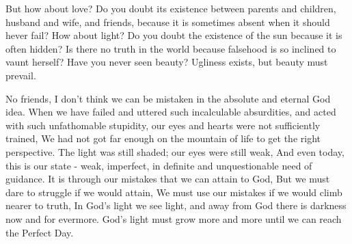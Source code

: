 But how about love? Do you doubt its existence
between parents and children, husband and wife, and
friends, because it is sometimes absent when it should
hever fail? How about light? Do you doubt the existence
of the sun because it is often hidden? Is there no truth
in the world because falsehood is so inclined to vaunt
herself? Have you never seen beauty? Ugliness exists, but
beauty must prevail.

No friends, I don't think we can be mistaken in the
absolute and eternal God idea. When we have failed and
uttered such incalculable absurdities, and acted with such
unfathomable stupidity, our eyes and hearts were not sufficiently
trained, We had not got far enough on the mountain
of life to get the right perspective. The light was still
shaded; our eyes were still weak, And even today, this is
our state - weak, imperfect, in definite and unquestionable
need of guidance. It is through our mistakes that we can
attain to God, But we must dare to struggle if we would
attain, We must use our mistakes if we would climb nearer
to truth, In God's light we see light, and away from God
there is darkness now and for evermore. God's light must
grow more and more until we can reach the Perfect Day.


